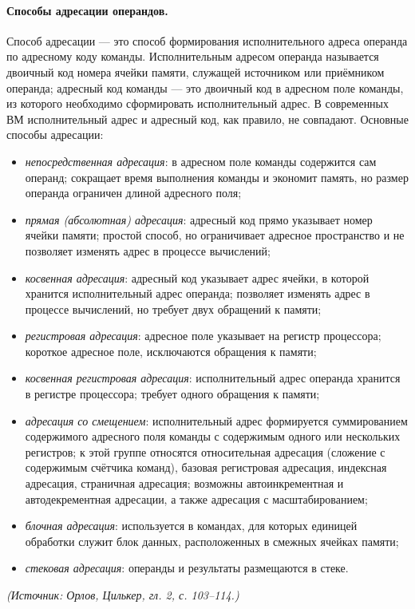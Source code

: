 \documentclass[a4paper,12pt]{article}
\begin{document}
\paragraph{Способы адресации операндов.}
Способ адресации --- это способ формирования исполнительного адреса операнда по адресному коду команды. Исполнительным адресом операнда называется двоичный код номера ячейки памяти, служащей источником или приёмником операнда; адресный код команды --- это двоичный код в адресном поле команды, из которого необходимо сформировать исполнительный адрес. В современных ВМ исполнительный адрес и адресный код, как правило, не совпадают. Основные способы адресации:
\begin{itemize}
\item \emph{непосредственная адресация}: в адресном поле команды содержится сам операнд; сокращает время выполнения команды и экономит память, но размер операнда ограничен длиной адресного поля;
\item \emph{прямая (абсолютная) адресация}: адресный код прямо указывает номер ячейки памяти; простой способ, но ограничивает адресное пространство и не позволяет изменять адрес в процессе вычислений;
\item \emph{косвенная адресация}: адресный код указывает адрес ячейки, в которой хранится исполнительный адрес операнда; позволяет изменять адрес в процессе вычислений, но требует двух обращений к памяти;
\item \emph{регистровая адресация}: адресное поле указывает на регистр процессора; короткое адресное поле, исключаются обращения к памяти;
\item \emph{косвенная регистровая адресация}: исполнительный адрес операнда хранится в регистре процессора; требует одного обращения к памяти;
\item \emph{адресация со смещением}: исполнительный адрес формируется суммированием содержимого адресного поля команды с содержимым одного или нескольких регистров; к этой группе относятся относительная адресация (сложение с содержимым счётчика команд), базовая регистровая адресация, индексная адресация, страничная адресация; возможны автоинкрементная и автодекрементная адресации, а также адресация с масштабированием;
\item \emph{блочная адресация}: используется в командах, для которых единицей обработки служит блок данных, расположенных в смежных ячейках памяти;
\item \emph{стековая адресация}: операнды и результаты размещаются в стеке.
\end{itemize}
\textit{(Источник: Орлов, Цилькер, гл. 2, с. 103--114.)}
\end{document}
